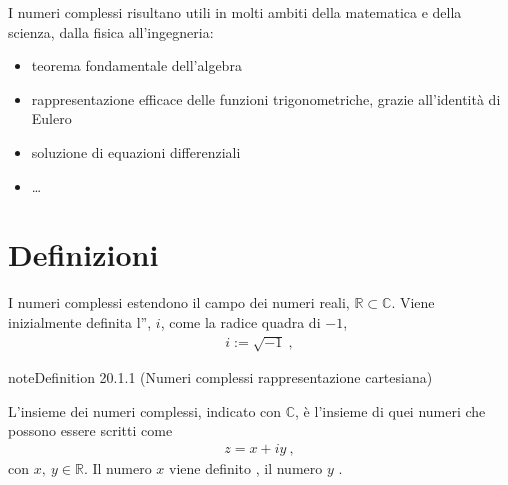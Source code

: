 \documentclass[letterpaper,10pt,italian]{jupyterBook}
\begin{document}
\sphinxAtStartPar
I numeri complessi risultano utili in molti ambiti della matematica e della scienza, dalla fisica all’ingegneria:
\begin{itemize}
\item {} 
\sphinxAtStartPar
teorema fondamentale dell’algebra

\item {} 
\sphinxAtStartPar
rappresentazione efficace delle funzioni trigonometriche, grazie all’identità di Eulero

\item {} 
\sphinxAtStartPar
soluzione di equazioni differenziali

\item {} 
\sphinxAtStartPar
…

\end{itemize}




\section{Definizioni}
\label{\detokenize{ch/algebra/complex-algebra:definizioni}}\label{\detokenize{ch/algebra/complex-algebra:math-hs-algebra-complex-def}}
\sphinxAtStartPar
I numeri complessi estendono il campo dei numeri reali, \(\mathbb{R} \subset \mathbb{C}\). Viene inizialmente definita l”, \(i\), come la radice quadra di \(-1\),
\begin{equation*}
\begin{split}i := \sqrt{-1} \ ,\end{split}
\end{equation*}
\sphinxAtStartPar
{}  
\label{ch/algebra/complex-algebra:definition-0}
\begin{sphinxadmonition}{note}{Definition 20.1.1 (Numeri complessi \sphinxhyphen{} rappresentazione cartesiana)}



\sphinxAtStartPar
L’insieme dei numeri complessi, indicato con \(\mathbb{C}\), è l’insieme di quei numeri che possono essere scritti come
\begin{equation*}
\begin{split}z = x + i y \ ,\end{split}
\end{equation*}
\sphinxAtStartPar
con \(x, \ y \in \mathbb{R}\). Il numero \(x\) viene definito , il numero \(y\) .
\end{sphinxadmonition}
\end{document}
